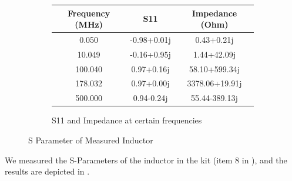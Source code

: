\documentclass{article}
\begin{document}
\begin{figure}[h]
    \begin{subfigure}{\linewidth}
        \centering
        \begin{tabular}{ |c|c|c| }
            \hline
            Frequency (MHz) & S11         & Impedance (Ohm)
            \\\hline
            0.050           & -0.98+0.01j & 0.43+0.21j
            \\\hline
            10.049          & -0.16+0.95j & 1.44+42.09j
            \\\hline
            100.040         & 0.97+0.16j  & 58.10+599.34j
            \\\hline
            178.032         & 0.97+0.00j  & 3378.06+19.91j
            \\\hline
            500.000         & 0.94-0.24j  & 55.44-389.13j
            \\\hline
        \end{tabular}
        \caption{S11 and Impedance at certain frequencies}
        \label{tab:inductor_meas}
    \end{subfigure}

    \caption{S Parameter of Measured Inductor}
    \label{fig:inductor_meas}
\end{figure}

We measured the S-Parameters of the inductor in the kit (item 8 in ), and the results are depicted in .
\end{document}

